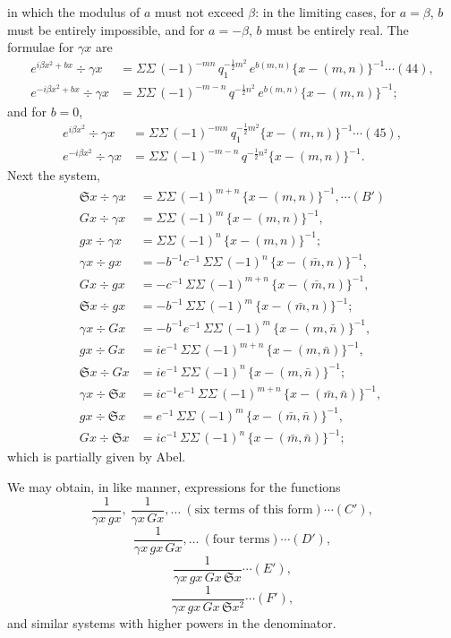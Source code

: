 \documentclass[12pt,a4paper]{article}
\newcommand{\fS}{\mathfrak{S}}
\newcommand{\mn}{(m,n)}
\newcommand{\mbn}{(\bar m,n)}
\newcommand{\mnb}{(m,\bar n)}
\newcommand{\mbnb}{(\bar m,\bar n)}
\begin{document}
\newpage
\setcounter{page}{150}

in which the modulus of $a$ must not exceed $\beta$: in the limiting cases, for $a = \beta$, $b$ must be entirely impossible, and for $a = -\beta$, $b$ must be entirely real. The formulae for $\gamma x$ are
\begin{align*}
e^{i\beta x^2 + b x}\div \gamma x &= \Sigma\Sigma\,(-1)^{-mn}\,q_1^{-\frac{1}{2}m^2}\,e^{b\mn}\{x - \mn\}^{-1} \cdots(44),\\
e^{-i\beta x^2 + b x}\div \gamma x &= \Sigma\Sigma\,(-1)^{-m-n}\,q^{-\frac{1}{2}n^2}\,e^{b\mn}\{x - \mn\}^{-1};
\end{align*}
and for $b = 0$,
\begin{align*}
e^{i\beta x^2}\div \gamma x &= \Sigma\Sigma\,(-1)^{-mn}\,q_1^{-\frac{1}{2}m^2}\{x - \mn\}^{-1} \cdots(45),\\
e^{-i\beta x^2}\div \gamma x &= \Sigma\Sigma\,(-1)^{-m-n}\,q^{-\frac{1}{2}n^2}\{x - \mn\}^{-1}.
\end{align*}
Next the system,
\begin{align*}
\fS x \div \gamma x &= \Sigma\Sigma\,(-1)^{m+n}\,\{x - \mn\}^{-1}, \cdots(B')\\
G x \div \gamma x &= \Sigma\Sigma\,(-1)^m\,\{x - \mn\}^{-1},\\
g x \div \gamma x &= \Sigma\Sigma\,(-1)^n\,\{x - \mn\}^{-1};\\[4pt]
\gamma x \div g x &= -b^{-1} c^{-1}\,\Sigma\Sigma\,(-1)^n\,\{x - \mbn\}^{-1},\\
G x \div g x &= -c^{-1}\,\Sigma\Sigma\,(-1)^{m+n}\,\{x - \mbn\}^{-1},\\
\fS x \div g x &= -b^{-1}\,\Sigma\Sigma\,(-1)^m\,\{x - \mbn\}^{-1};\\[4pt]
\gamma x \div G x &= -b^{-1} e^{-1}\,\Sigma\Sigma\,(-1)^m\,\{x - \mnb\}^{-1},\\
g x \div G x &= i e^{-1}\,\Sigma\Sigma\,(-1)^{m+n}\,\{x - \mnb\}^{-1},\\
\fS x \div G x &= i e^{-1}\,\Sigma\Sigma\,(-1)^n\,\{x - \mnb\}^{-1};\\[4pt]
\gamma x \div \fS x &= ic^{-1} e^{-1}\,\Sigma\Sigma\,(-1)^{m+n}\,\{x - \mbnb\}^{-1},\\
g x \div \fS x &= e^{-1}\,\Sigma\Sigma\,(-1)^m\,\{x - \mbnb\}^{-1},\\
G x \div \fS x &= i c^{-1}\,\Sigma\Sigma\,(-1)^n\,\{x - \mbnb\}^{-1};
\end{align*}
which is partially given by Abel.

We may obtain, in like manner, expressions for the functions
\[
\frac{1}{\gamma x\,g x},\ \frac{1}{\gamma x\,G x},\ldots\ (\text{six terms of this form}) \cdots(C'),
\]
\[
\frac{1}{\gamma x\,g x\,G x},\ldots\ (\text{four terms}) \cdots(D'),
\]
\[
\frac{1}{\gamma x\,g x\,G x\,\fS x} \cdots(E'),
\]
\[
\frac{1}{\gamma x\,g x\,G x\,\fS x^2} \cdots(F'),
\]
and similar systems with higher powers in the denominator.
\end{document}
